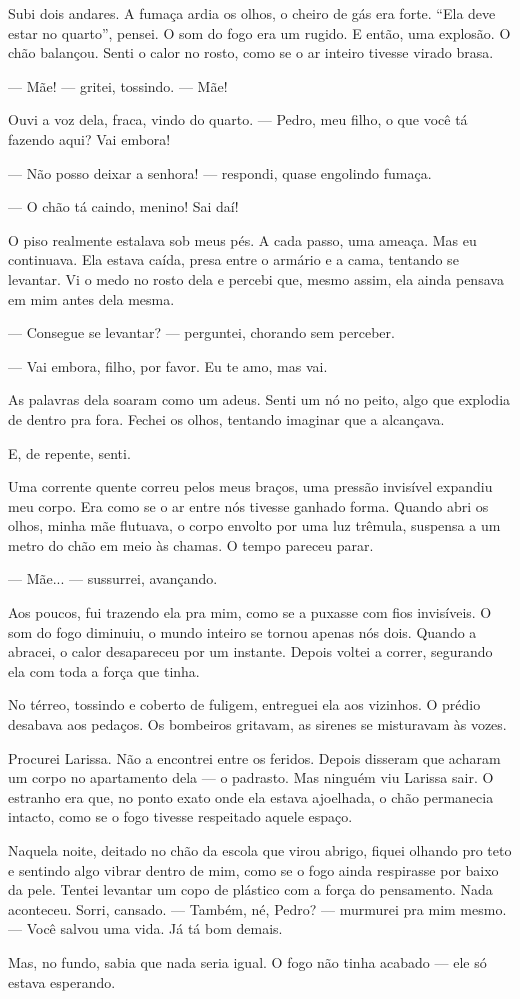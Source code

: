 \medskip

Subi dois andares.  
A fumaça ardia os olhos, o cheiro de gás era forte.  
“Ela deve estar no quarto”, pensei.  
O som do fogo era um rugido.  
E então, uma explosão.  
O chão balançou.  
Senti o calor no rosto, como se o ar inteiro tivesse virado brasa.

— Mãe! — gritei, tossindo. — Mãe!

Ouvi a voz dela, fraca, vindo do quarto.  
— Pedro, meu filho, o que você tá fazendo aqui? Vai embora!

— Não posso deixar a senhora! — respondi, quase engolindo fumaça.

— O chão tá caindo, menino! Sai daí!

O piso realmente estalava sob meus pés.  
A cada passo, uma ameaça.  
Mas eu continuava.  
Ela estava caída, presa entre o armário e a cama, tentando se levantar.  
Vi o medo no rosto dela e percebi que, mesmo assim, ela ainda pensava em mim antes dela mesma.

— Consegue se levantar? — perguntei, chorando sem perceber.

— Vai embora, filho, por favor. Eu te amo, mas vai.

As palavras dela soaram como um adeus.  
Senti um nó no peito, algo que explodia de dentro pra fora.  
Fechei os olhos, tentando imaginar que a alcançava.

E, de repente, senti.

Uma corrente quente correu pelos meus braços, uma pressão invisível expandiu meu corpo.  
Era como se o ar entre nós tivesse ganhado forma.  
Quando abri os olhos, minha mãe flutuava, o corpo envolto por uma luz trêmula, suspensa a um metro do chão em meio às chamas.  
O tempo pareceu parar.

— Mãe... — sussurrei, avançando.

Aos poucos, fui trazendo ela pra mim, como se a puxasse com fios invisíveis.  
O som do fogo diminuiu, o mundo inteiro se tornou apenas nós dois.  
Quando a abracei, o calor desapareceu por um instante.  
Depois voltei a correr, segurando ela com toda a força que tinha.

\medskip

No térreo, tossindo e coberto de fuligem, entreguei ela aos vizinhos.  
O prédio desabava aos pedaços.  
Os bombeiros gritavam, as sirenes se misturavam às vozes.

Procurei Larissa.  
Não a encontrei entre os feridos.  
Depois disseram que acharam um corpo no apartamento dela — o padrasto.  
Mas ninguém viu Larissa sair.  
O estranho era que, no ponto exato onde ela estava ajoelhada, o chão permanecia intacto, como se o fogo tivesse respeitado aquele espaço.

\medskip

Naquela noite, deitado no chão da escola que virou abrigo, fiquei olhando pro teto e sentindo algo vibrar dentro de mim, como se o fogo ainda respirasse por baixo da pele.  
Tentei levantar um copo de plástico com a força do pensamento.  
Nada aconteceu.  
Sorri, cansado.  
— Também, né, Pedro? — murmurei pra mim mesmo. — Você salvou uma vida. Já tá bom demais.

Mas, no fundo, sabia que nada seria igual.  
O fogo não tinha acabado — ele só estava esperando.
